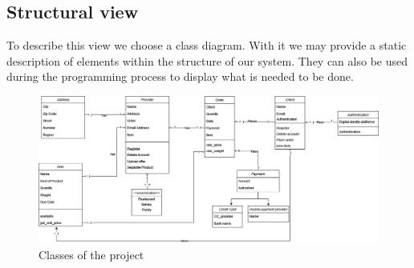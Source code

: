 \newpage
\subsection{Structural view}
To describe this view we choose a \gls{class diagram}. With it we may provide a static description of elements
within the structure of our system. They can also be used during the programming process to display what is needed
to be done.

\begin{figure}[H]
    \centering
    \includegraphics[width=1\textwidth]{assets/classes_CD.jpg}
    \caption{Classes of the project}
    \label{fig:class_CD}
\end{figure}
 


